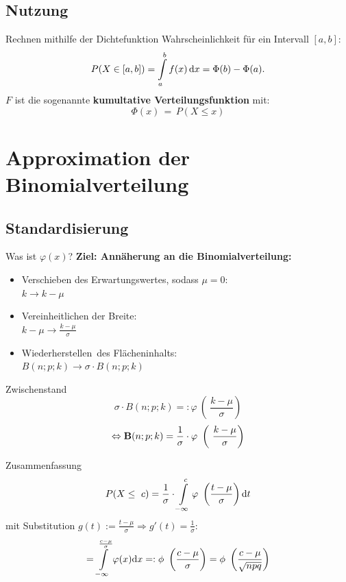 \documentclass[14pt]{beamer}
\begin{document}
\subsection{Nutzung}
\begin{frame}{Rechnen mithilfe der Dichtefunktion}
Wahrscheinlichkeit für ein Intervall $[a,b]$:
$$P(X\in [a,b]) = \int\displaylimits_a^b f(x)\, {\rm d}x = \Phi(b)-\Phi(a).$$
$F$ ist die sogenannte \textbf{kumultative Verteilungsfunktion} mit:
$$\Phi(x) \, = \, P(X \le x)$$
\end{frame}

\section{Approximation der Binomialverteilung}
\subsection{Standardisierung}
\begin{frame}{Was ist $\varphi(x)$?}
\textbf{Ziel: Annäherung an die Binomialverteilung:}
\pause
\begin{itemize}
\item Verschieben des Erwartungswertes, sodass $\mu=0$:\\
$k \to k-\mu$
\item Vereinheitlichen der Breite:\\
$k-\mu \to \frac{k-\mu}{\sigma}$
\pause
\item \glqq Wiederherstellen\grqq\ des Flächeninhalts:\\
$B(n;p;k) \to \sigma \cdot B(n;p;k)$
\end{itemize}

\end{frame}

\begin{frame}{Zwischenstand}
$$
\sigma \cdot B(n;p;k) =: \varphi\ \left(\ \frac{k-\mu}{\sigma}\right)
$$
$$
\Leftrightarrow
\begin{mathbf}
B(n;p;k) =  \frac{1}{\sigma} \cdot  \varphi\ \left(\ \frac{k-\mu}{\sigma}\right)
\end{mathbf}
$$
\end{frame}


\begin{frame}{Zusammenfassung}
$$
P(X\leq\ c) = \frac{1}{\sigma} \cdot \int\displaylimits^c_{-\infty} \varphi\ \left(\frac{t-\mu}{\sigma}\right) {\mathrm d}t
$$
mit Substitution $g(t):=\frac{t-\mu}{\sigma} \Rightarrow g'(t)=\frac{1}{\sigma}$:
$$
= \int\displaylimits^{\frac{c-\mu}{\sigma}}_{-\infty} \varphi(x) {\mathrm d}x =: \phi\ \left(\frac{c-\mu}{\sigma}\right) = \phi\ \left( \frac{c-\mu}{\sqrt{npq}}\right)
$$
\end{frame}
\end{document}
